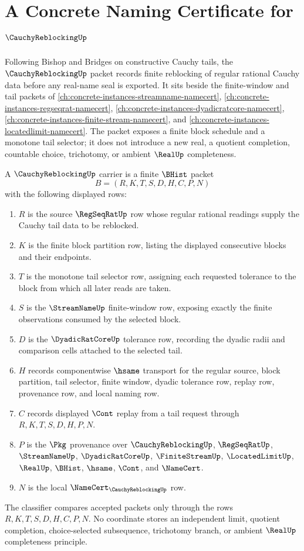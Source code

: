 \chapter{A Concrete Naming Certificate for $\CauchyReblockingUp$}
\label{ch:concrete-instances-cauchy-reblocking-namecert}

Following Bishop and Bridges on constructive Cauchy tails, the $\CauchyReblockingUp$ packet records finite reblocking of regular rational Cauchy data before any real-name seal is exported. It sits beside the finite-window and tail packets of \autoref{ch:concrete-instances-streamname-namecert}, \autoref{ch:concrete-instances-regseqrat-namecert}, \autoref{ch:concrete-instances-dyadicratcore-namecert}, \autoref{ch:concrete-instances-finite-stream-namecert}, and \autoref{ch:concrete-instances-locatedlimit-namecert}. The packet exposes a finite block schedule and a monotone tail selector; it does not introduce a new real, a quotient completion, countable choice, trichotomy, or ambient $\RealUp$ completeness.

\begin{definition}
\label{def:cauchy-reblocking-carrier}
A $\CauchyReblockingUp$ carrier is a finite $\BHist$ packet
$$
B=(R,K,T,S,D,H,C,P,N)
$$
with the following displayed rows:
\begin{enumerate}
\item $R$ is the source $\RegSeqRatUp$ row whose regular rational readings supply the Cauchy tail data to be reblocked.
\item $K$ is the finite block partition row, listing the displayed consecutive blocks and their endpoints.
\item $T$ is the monotone tail selector row, assigning each requested tolerance to the block from which all later reads are taken.
\item $S$ is the $\StreamNameUp$ finite-window row, exposing exactly the finite observations consumed by the selected block.
\item $D$ is the $\DyadicRatCoreUp$ tolerance row, recording the dyadic radii and comparison cells attached to the selected tail.
\item $H$ records componentwise $\hsame$ transport for the regular source, block partition, tail selector, finite window, dyadic tolerance row, replay row, provenance row, and local naming row.
\item $C$ records displayed $\Cont$ replay from a tail request through $R,K,T,S,D,H,P,N$.
\item $P$ is the $\Pkg$ provenance over $\CauchyReblockingUp$, $\RegSeqRatUp$, $\StreamNameUp$, $\DyadicRatCoreUp$, $\FiniteStreamUp$, $\LocatedLimitUp$, $\RealUp$, $\BHist$, $\hsame$, $\Cont$, and $\NameCert$.
\item $N$ is the local $\NameCert_{\CauchyReblockingUp}$ row.
\end{enumerate}
The classifier compares accepted packets only through the rows $R,K,T,S,D,H,C,P,N$. No coordinate stores an independent limit, quotient completion, choice-selected subsequence, trichotomy branch, or ambient $\RealUp$ completeness principle.
\end{definition}

